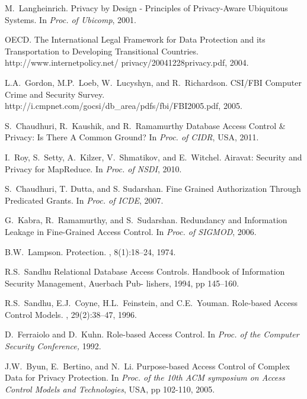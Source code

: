 \begin{thebibliography}{AH89}
M.~Langheinrich.
\newblock Privacy by Design - Principles of Privacy-Aware Ubiquitous Systems.
\newblock In {\em Proc. of Ubicomp}, 2001.

OECD. \newblock The International Legal Framework for Data Protection and its Transportation to Developing Transitional Countries.
\newblock http://www.internetpolicy.net/ privacy/20041228privacy.pdf, 2004.

L.A.~Gordon, M.P.~Loeb, W.~Lucyshyn, and R.~Richardson.
\newblock CSI/FBI Computer Crime and Security Survey.
\newblock http://i.cmpnet.com/gocsi/db\_area/pdfs/fbi/FBI2005.pdf, 2005.

S.~Chaudhuri, R.~Kaushik, and R.~Ramamurthy
\newblock Database Access Control {\&} Privacy: Is There A Common Ground?
\newblock In {\em Proc. of CIDR}, USA, 2011.

I.~Roy, S.~Setty, A.~Kilzer, V.~Shmatikov, and E.~Witchel.
\newblock Airavat: Security and Privacy for MapReduce.
\newblock In {\em Proc. of NSDI}, 2010.

S.~Chaudhuri, T. Dutta, and S. Sudarshan.
\newblock Fine Grained Authorization Through Predicated Grants.
\newblock In {\em Proc. of ICDE}, 2007.

G.~Kabra, R.~Ramamurthy, and S.~Sudarshan.
\newblock Redundancy and Information Leakage in Fine-Grained Access Control.
\newblock In {\em Proc. of SIGMOD}, 2006.

B.W.~Lampson.
\newblock Protection.
, 8(1):18--24, 1974.

R.S.~Sandhu
\newblock Relational Database Access Controls.
\newblock Handbook of Information Security Management, Auerbach Pub-
lishers, 1994, pp 145--160.

R.S.~Sandhu, E.J.~Coyne, H.L.~Feinstein, and C.E.~Youman.
\newblock Role-based Access Control Models.
, 29(2):38--47, 1996.

D.~Ferraiolo and D.~Kuhn.
\newblock Role-based Access Control.
\newblock In {\em Proc. of the Computer Security Conference,} 1992.

J.W.~Byun, E.~Bertino, and N.~Li.
\newblock Purpose-based Access Control of Complex Data for Privacy Protection.
\newblock In {\em Proc. of the 10th ACM symposium on Access Control Models and Technologies},
USA, pp 102-110, 2005.


\end{thebibliography}

